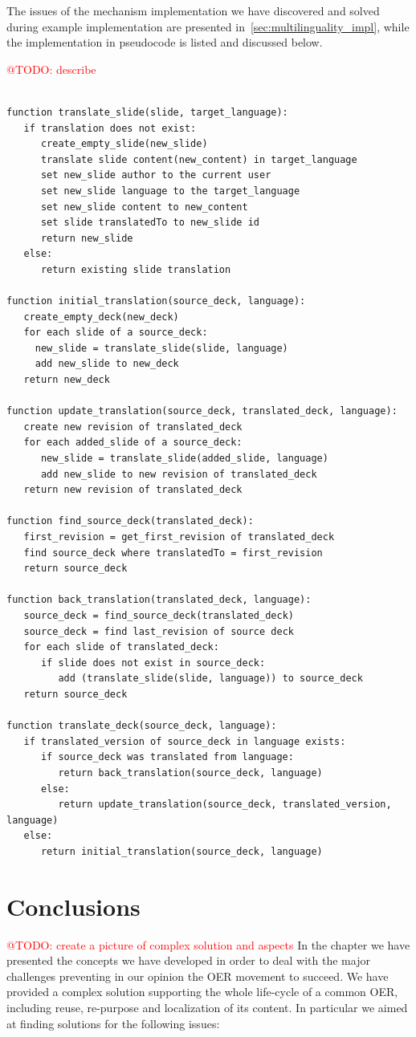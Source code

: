 \documentclass[ngerman,UKenglish,table]{scrbook}
\makeatletter
\newcommand{\todo}[1]{\textcolor{red}{@TODO: #1}}
\makeatother
\begin{document}
The issues of the mechanism implementation we have discovered and solved during example implementation are presented in~\autoref{sec:multilinguality_impl}, while the implementation in pseudocode is listed and discussed below.


\todo{describe}


\begin{lstlisting}

function translate_slide(slide, target_language):
   if translation does not exist:
      create_empty_slide(new_slide)
      translate slide content(new_content) in target_language  
      set new_slide author to the current user
      set new_slide language to the target_language
      set new_slide content to new_content
      set slide translatedTo to new_slide id
      return new_slide
   else: 
      return existing slide translation
   
function initial_translation(source_deck, language):
   create_empty_deck(new_deck)
   for each slide of a source_deck:
     new_slide = translate_slide(slide, language)
     add new_slide to new_deck
   return new_deck
   
function update_translation(source_deck, translated_deck, language):
   create new revision of translated_deck
   for each added_slide of a source_deck:     
      new_slide = translate_slide(added_slide, language)
      add new_slide to new revision of translated_deck
   return new revision of translated_deck
   
function find_source_deck(translated_deck):
   first_revision = get_first_revision of translated_deck 
   find source_deck where translatedTo = first_revision
   return source_deck
   
function back_translation(translated_deck, language):
   source_deck = find_source_deck(translated_deck)
   source_deck = find last_revision of source deck
   for each slide of translated_deck:
      if slide does not exist in source_deck:
         add (translate_slide(slide, language)) to source_deck
   return source_deck
   
function translate_deck(source_deck, language):
   if translated_version of source_deck in language exists:
      if source_deck was translated from language:
         return back_translation(source_deck, language)
      else:
         return update_translation(source_deck, translated_version, language)
   else:
      return initial_translation(source_deck, language)
\end{lstlisting}


\section{Conclusions}
\todo{create a picture of complex solution and aspects}
In the chapter we have presented the concepts we have developed in order to deal with the major challenges preventing in our opinion the OER movement to succeed.
We have provided a complex solution supporting the whole life-cycle of a common OER, including reuse, re-purpose and localization of its content.
In particular we aimed at finding solutions for the following issues:
\end{document}
